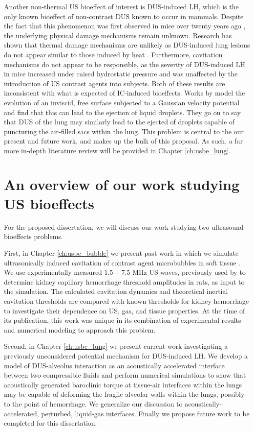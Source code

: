 Another non-thermal \ac{US} bioeffect of interest is \ac{DUS}-induced
\ac{LH}, which is the only known bioeffect of non-contrast \ac{DUS}
known to occur in mammals. Despite the fact that this phenomenon was
first observed in mice over twenty years ago \citep{Child1990}, the
underlying physical damage mechanisms remain unknown. Research has
shown that thermal damage mechanisms are unlikely as \ac{DUS}-induced
lung lesions do not appear similar to those induced by heat
\citep{Zachary2006}. Furthermore, cavitation mechanisms do not appear
to be responsible, as the severity of \ac{DUS}-induced \ac{LH} in mice
increased under raised hydrostatic pressure \citep{OBrien2000} and was
unaffected by the introduction of \ac{US} contrast agents into
subjects. Both of these results are inconsistent with what is expected
of \ac{IC}-induced bioeffects. Works by \cite{Tjan2007,Tjan2008} model
the evolution of an inviscid, free surface subjected to a Gaussian
velocity potential and find that this can lead to the ejection of
liquid droplets. They go on to say that \ac{DUS} of the lung may
similarly lead to the ejected of droplets capable of puncturing the
air-filled sacs within the lung. This problem is central to the our
present and future work, and makes up the bulk of this proposal. As
such, a far more in-depth literature review will be provided in
Chapter \ref{ch:usbe_lung}.

\section{An overview of our work studying \ac{US}
  bioeffects} \label{sec:usbe_intro_overview}%
For the proposed dissertation, we will discuss our work studying two
ultrasound bioeffects problems. 

First, in Chapter \ref{ch:usbe_bubble} we present past work in which
we simulate ultrasonically induced cavitation of contrast agent
microbubbles in soft tissue \citep{Patterson2012}. We use
experimentally measured $1.5-7.5$ MHz \ac{US} waves, previously used
by \cite{Miller2008b} to determine kidney capillary hemorrhage
threshold amplitudes in rats, as input to the simulation. The
calculated cavitation dynamics and theoretical inertial cavitation
thresholds \citep{Flynn1982,Apfel1982} are compared with known
thresholds for kidney hemorrhage to investigate their dependence on
US, gas, and tissue properties. At the time of its publication, this
work was unique in its combination of experimental results and
numerical modeling to approach this problem.

Second, in Chapter \ref{ch:usbe_lung} we present current work
investigating a previously unconsidered potential mechanism for
\ac{DUS}-induced \ac{LH}. We develop a model of \ac{DUS}-alveolus
interaction as an acoustically accelerated interface between two
compressible fluids and perform numerical simulations to show that
acoustically generated baroclinic torque at tissue-air interfaces
within the lungs may be capable of deforming the fragile alveolar
walls within the lungs, possibly to the point of hemorrhage. We
generalize our discussion to acoustically-accelerated, perturbed,
liquid-gas interfaces. Finally we propose future work to be completed
for this dissertation.
